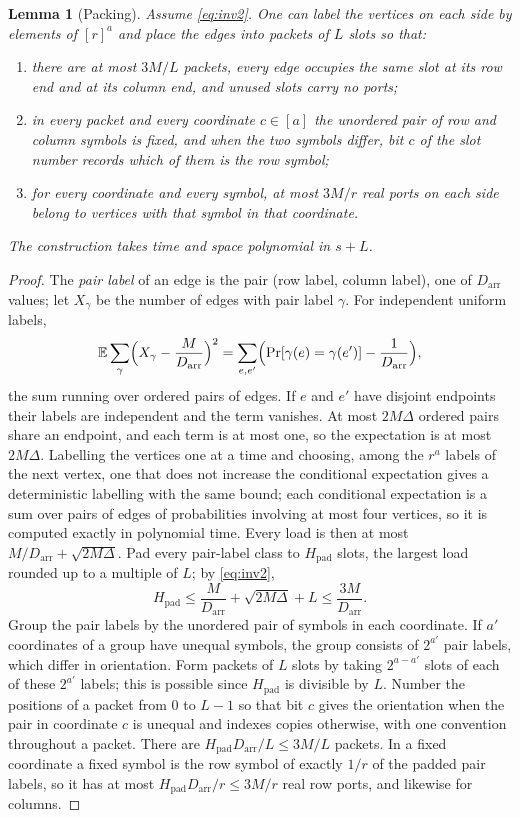 \documentclass[11pt,reqno]{amsart}
\numberwithin{equation}{section}
\theoremstyle{plain}
\newtheorem{lemma}[theorem]{Lemma}
\theoremstyle{definition}
\theoremstyle{remark}
\newcommand{\Darr}{D_{\mathrm{arr}}}
\begin{document}
\begin{lemma}[Packing]\label{lem:packing}
Assume \eqref{eq:inv2}. One can label the vertices on each side by elements of
$[r]^a$ and place the edges into \emph{packets} of $L$ slots so that:
\begin{enumerate}[label=\textup{(\arabic*)},leftmargin=2.2em]
\item there are at most $3M/L$ packets, every edge occupies the same slot at its
row end and at its column end, and unused slots carry no ports;
\item in every packet and every coordinate $c\in[a]$ the unordered pair of row
and column symbols is fixed, and when the two symbols differ, bit $c$ of the
slot number records which of them is the row symbol;
\item for every coordinate and every symbol, at most $3M/r$ real ports on each
side belong to vertices with that symbol in that coordinate.
\end{enumerate}
The construction takes time and space polynomial in $s+L$.
\end{lemma}

\begin{proof}
The \emph{pair label} of an edge is the pair (row label, column label), one of
$\Darr$ values; let $X_\gamma$ be the number of edges with pair label $\gamma$.
For independent uniform labels,
\[
\mathbb E\sum_\gamma\Bigl(X_\gamma-\frac M{\Darr}\Bigr)^2
=\sum_{e,e'}\Bigl(\Pr[\gamma(e)=\gamma(e')]-\frac1{\Darr}\Bigr),
\]
the sum running over ordered pairs of edges. If $e$ and $e'$ have disjoint
endpoints their labels are independent and the term vanishes. At most $2M\Delta$
ordered pairs share an endpoint, and each term is at most one, so the
expectation is at most $2M\Delta$. Labelling the vertices one at a time and
choosing, among the $r^a$ labels of the next vertex, one that does not increase
the conditional expectation \cite{Rag88} gives a deterministic labelling with
the same bound; each conditional expectation is a sum over pairs of edges of
probabilities involving at most four vertices, so it is computed exactly in
polynomial time. Every load is then at most $M/\Darr+\sqrt{2M\Delta}$. Pad every
pair-label class to $H_{\mathrm{pad}}$ slots, the largest load rounded up to a
multiple of $L$; by \eqref{eq:inv2},
\[
H_{\mathrm{pad}}\le\frac M{\Darr}+\sqrt{2M\Delta}+L\le\frac{3M}{\Darr}.
\]
Group the pair labels by the unordered pair of symbols in each coordinate. If
$a'$ coordinates of a group have unequal symbols, the group consists of $2^{a'}$
pair labels, which differ in orientation. Form packets of $L$ slots by taking
$2^{a-a'}$ slots of each of these $2^{a'}$ labels; this is possible since
$H_{\mathrm{pad}}$ is divisible by $L$. Number the positions of a packet from $0$
to $L-1$ so that bit $c$ gives the orientation when the pair in coordinate $c$ is
unequal and indexes copies otherwise, with one convention throughout a packet.
There are $H_{\mathrm{pad}}\Darr/L\le3M/L$ packets. In a fixed coordinate a fixed
symbol is the row symbol of exactly $1/r$ of the padded pair labels, so it has at
most $H_{\mathrm{pad}}\Darr/r\le3M/r$ real row ports, and likewise for columns.
\end{proof}
\end{document}
